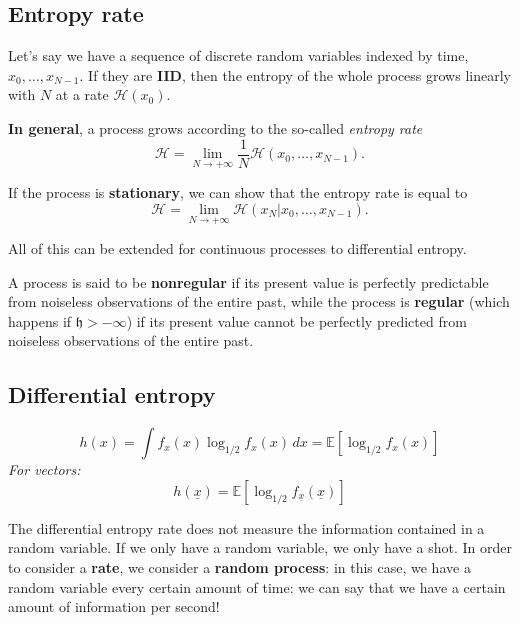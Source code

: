 \documentclass[a4paper, 12pt]{book}
\begin{document}
\subsection{Entropy rate}

Let's say we have a sequence of discrete random variables indexed by time, $x_0, \dots, x_{N-1}$.
If they are \textbf{IID}, then the entropy of the whole process grows linearly with $N$ at a rate $\mathcal{H}(x_0)$.

\textbf{In general}, a process grows according to the so-called \textit{entropy rate}
\begin{equation}
    \mathcal{H} = \lim_{N \to +\infty} \frac{1}{N} \mathcal{H}(x_0, \dots, x_{N-1}). \tag{1.32}
\end{equation}

If the process is \textbf{stationary}, we can show that the entropy rate is equal to
\begin{equation}
    \mathcal{H} = \lim_{N \to +\infty} \mathcal{H}(x_N | x_0, \dots, x_{N-1}). \tag{1.33}
\end{equation}

All of this can be extended for continuous processes to differential entropy.

A process is said to be \textbf{nonregular} if its present value is perfectly predictable from noiseless observations of the entire past, while the process is \textbf{regular} (which happens if $\mathfrak{h} > -\infty$) if its present value cannot be perfectly predicted from noiseless observations of the entire past.

\subsection{Differential entropy}

\begin{definition}
    \[ h(x) = \int f_x(x) \log_{1/2} f_x(x) \, dx = \mathbb{E}\left[\log_{1/2} f_x(x)\right] \]
    \textit{For vectors:}
    \[ h(\underline{x}) = \mathbb{E}\left[\log_{1/2} f_{\underline{x}}(\underline{x})\right] \]
\end{definition}

The differential entropy rate does not measure the information contained in a random variable.
If we only have a random variable, we only have a shot. In order to consider a \textbf{rate}, we consider a \textbf{random process}: in this case, we have a random variable every certain amount of time: we can say that we have a certain amount of information per second!
\end{document}
